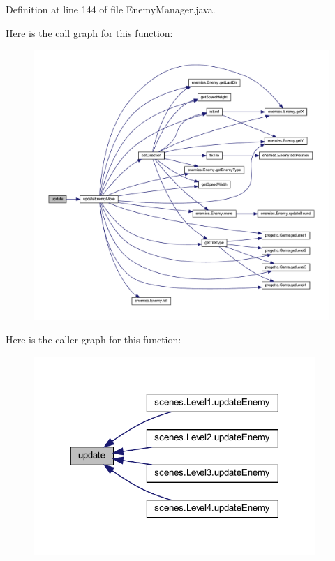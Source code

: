 Definition at line 144 of file Enemy\+Manager.\+java.

Here is the call graph for this function\+:\nopagebreak
\begin{figure}[H]
\begin{center}
\leavevmode
\includegraphics[width=350pt]{classmanagers_1_1_enemy_manager_ac5c54df7ed3b930268c8d7752c101725_cgraph}
\end{center}
\end{figure}
Here is the caller graph for this function\+:\nopagebreak
\begin{figure}[H]
\begin{center}
\leavevmode
\includegraphics[width=303pt]{classmanagers_1_1_enemy_manager_ac5c54df7ed3b930268c8d7752c101725_icgraph}
\end{center}
\end{figure}
\mbox{\label{classmanagers_1_1_enemy_manager_a5c2bac0f4b9a3ef4e30f60d4b0c3b951}} 

